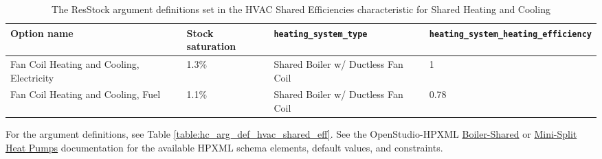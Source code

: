 \begin{longtable}[]{|p{3cm}|p{3cm}|p{3cm}|p{4cm}|} 
\caption{The ResStock argument definitions set in the HVAC Shared Efficiencies characteristic for Shared Heating and Cooling} \label{table:hc_arg_def_hvac_shared_eff_both}\\
\toprule\noalign{}
Option name & Stock saturation & \texttt{heating\_system\_type} &
\texttt{heating\_system\_heating\_efficiency} \\
\midrule\noalign{}
\endhead
\bottomrule\noalign{}
\endlastfoot
Fan Coil Heating and Cooling, Electricity & 1.3\% & Shared Boiler w/
Ductless Fan Coil & 1 \\
\hline
Fan Coil Heating and Cooling, Fuel & 1.1\% & Shared Boiler w/ Ductless
Fan Coil & 0.78  \\
\end{longtable}


For the argument definitions, see Table \ref{table:hc_arg_def_hvac_shared_eff}. See the OpenStudio-HPXML \href{https://openstudio-hpxml.readthedocs.io/en/v1.8.1/workflow_inputs.html#boiler-shared}{Boiler-Shared} or \href{https://openstudio-hpxml.readthedocs.io/en/v1.8.1/workflow_inputs.html#mini-split-heat-pump}{Mini-Split Heat Pumps} documentation for the available HPXML schema elements, default values, and constraints.

